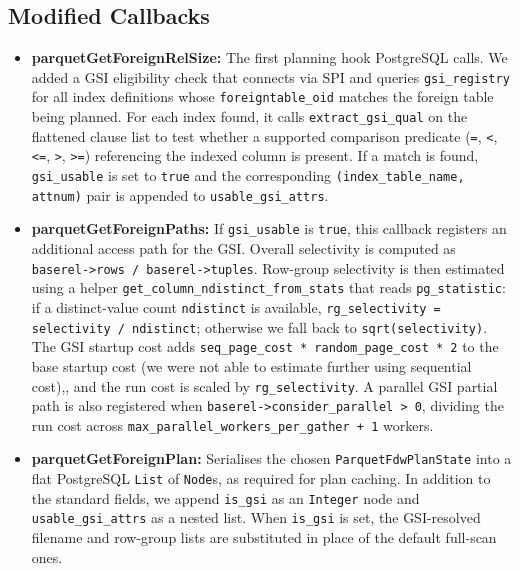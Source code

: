 \documentclass[11pt, a4paper]{article}
\begin{document}
\subsection{Modified Callbacks}

\begin{itemize}

\item \textbf{parquetGetForeignRelSize:} The first planning hook PostgreSQL calls. We
added a GSI eligibility check that connects via SPI and queries \texttt{gsi\_registry}
for all index definitions whose \texttt{foreigntable\_oid} matches the foreign table
being planned. For each index found, it calls \texttt{extract\_gsi\_qual} on the
flattened clause list to test whether a supported comparison predicate
(\texttt{=}, \texttt{<}, \texttt{<=}, \texttt{>}, \texttt{>=}) referencing the indexed
column is present. If a match is found, \texttt{gsi\_usable} is set to \texttt{true}
and the corresponding \texttt{(index\_table\_name, attnum)} pair is appended to
\texttt{usable\_gsi\_attrs}.

\item \textbf{parquetGetForeignPaths:} If \texttt{gsi\_usable} is \texttt{true}, this
callback registers an additional access path for the GSI. Overall selectivity is
computed as \texttt{baserel->rows / baserel->tuples}. Row-group selectivity is then
estimated using a helper \texttt{get\_column\_ndistinct\_from\_stats} that reads
\texttt{pg\_statistic}: if a distinct-value count \texttt{ndistinct} is available,
\texttt{rg\_selectivity = selectivity / ndistinct}; otherwise we fall back to
\texttt{sqrt(selectivity)}. The GSI startup cost adds
\texttt{seq\_page\_cost * random\_page\_cost * 2} to the base startup cost (we were not able to estimate further using sequential cost),, and the
run cost is scaled by \texttt{rg\_selectivity}. A parallel GSI partial path is also
registered when \texttt{baserel->consider\_parallel > 0}, dividing the run cost
across \texttt{max\_parallel\_workers\_per\_gather + 1} workers.

\item \textbf{parquetGetForeignPlan:} Serialises the chosen \texttt{ParquetFdwPlanState} into a flat PostgreSQL \texttt{List} of \texttt{Node}s, as required for plan caching. In addition to the standard fields, we append \texttt{is\_gsi} as an \texttt{Integer} node and \texttt{usable\_gsi\_attrs} as a nested list. When \texttt{is\_gsi} is set, the GSI-resolved filename and row-group lists are substituted in place of the default full-scan ones.


\end{itemize}
\end{document}

